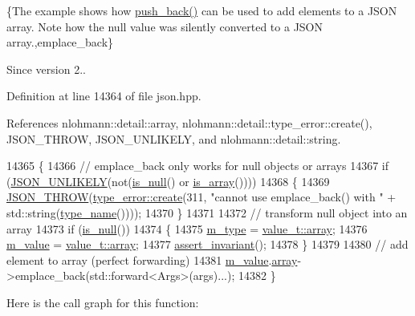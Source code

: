 \{The example shows how {\ttfamily \hyperlink{classnlohmann_1_1basic__json_ac8e523ddc8c2dd7e5d2daf0d49a9c0d7}{push\+\_\+back()}} can be used to add elements to a J\+S\+ON array. Note how the {\ttfamily null} value was silently converted to a J\+S\+ON array.,emplace\+\_\+back\}

\begin{DoxySince}{Since}
version 2.. 
\end{DoxySince}


Definition at line 14364 of file json.\+hpp.



References nlohmann\+::detail\+::array, nlohmann\+::detail\+::type\+\_\+error\+::create(), J\+S\+O\+N\+\_\+\+T\+H\+R\+OW, J\+S\+O\+N\+\_\+\+U\+N\+L\+I\+K\+E\+LY, and nlohmann\+::detail\+::string.


\begin{DoxyCode}
14365     \{
14366         \textcolor{comment}{// emplace\_back only works for null objects or arrays}
14367         \textcolor{keywordflow}{if} (\hyperlink{json_8hpp_ab77582407c64944e7db1ea95ab520253}{JSON\_UNLIKELY}(not(\hyperlink{classnlohmann_1_1basic__json_a8faa039ca82427ed29c486ffd00600c3}{is\_null}() or \hyperlink{classnlohmann_1_1basic__json_aef9ce5dd2381caee1f8ddcdb5bdd9c65}{is\_array}())))
14368         \{
14369             \hyperlink{json_8hpp_a6c274f6db2e65c1b66c7d41b06ad690f}{JSON\_THROW}(\hyperlink{classnlohmann_1_1detail_1_1type__error_aecc083aea4b698c33d042670ba50c10f}{type\_error::create}(311, \textcolor{stringliteral}{"cannot use emplace\_back() with 
      "} + std::string(\hyperlink{classnlohmann_1_1basic__json_a9d0a478571f82f0163b96b2424cd998f}{type\_name}())));
14370         \}
14371 
14372         \textcolor{comment}{// transform null object into an array}
14373         \textcolor{keywordflow}{if} (\hyperlink{classnlohmann_1_1basic__json_a8faa039ca82427ed29c486ffd00600c3}{is\_null}())
14374         \{
14375             \hyperlink{classnlohmann_1_1basic__json_a91990b60d7d4d67968a2c1db677536e7}{m\_type} = \hyperlink{namespacenlohmann_1_1detail_a1ed8fc6239da25abcaf681d30ace4985af1f713c9e000f5d3f280adbd124df4f5}{value\_t::array};
14376             \hyperlink{classnlohmann_1_1basic__json_aeb0814f76966f99290cb29e127c90a77}{m\_value} = \hyperlink{namespacenlohmann_1_1detail_a1ed8fc6239da25abcaf681d30ace4985af1f713c9e000f5d3f280adbd124df4f5}{value\_t::array};
14377             \hyperlink{classnlohmann_1_1basic__json_a4a82d3fb7a111641decf35c2fb707c7f}{assert\_invariant}();
14378         \}
14379 
14380         \textcolor{comment}{// add element to array (perfect forwarding)}
14381         \hyperlink{classnlohmann_1_1basic__json_aeb0814f76966f99290cb29e127c90a77}{m\_value}.\hyperlink{unionnlohmann_1_1basic__json_1_1json__value_a7947687f3ae1911d6e9847e2b3226157}{array}->emplace\_back(std::forward<Args>(args)...);
14382     \}
\end{DoxyCode}
Here is the call graph for this function\+:
\mbox{\label{classnlohmann_1_1basic__json_a1a86d444bfeaa9518d2421aedd74444a}} 
